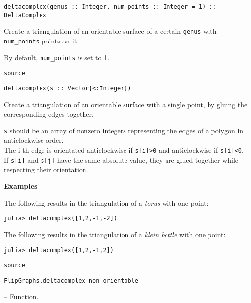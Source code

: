 \begin{adjustwidth}{2em}{0pt}


\begin{verbatim}
deltacomplex(genus :: Integer, num_points :: Integer = 1) :: DeltaComplex
\end{verbatim}

Create a triangulation of an orientable surface of a certain \texttt{genus} with \texttt{num\_points} points on it. 

By default, \texttt{num\_points} is set to 1.



\href{https://github.com/schto223/FlipGraphs.jl/blob/e35d43698a06b86273148826b79d585ba04fcd26/src/deltaComplex.jl#L590-L596}{\texttt{source}}



\begin{verbatim}
deltacomplex(s :: Vector{<:Integer})
\end{verbatim}

Create a triangulation of an orientable surface with a single point, by gluing the corresponding edges together.

\texttt{s} should be an array of nonzero integers representing the edges of a polygon in anticlockwise order.\\
The i-th edge is orientated anticlockwise if \texttt{s[i]>0} and anticlockwise if \texttt{s[i]<0}.\\
If \texttt{s[i]} and \texttt{s[j]} have the same absolute value, they are glued together while respecting their orientation.

\textbf{Examples}

The following results in the triangulation of a \emph{torus} with one point:


\begin{verbatim}
julia> deltacomplex([1,2,-1,-2])
\end{verbatim}

The following results in the triangulation of a \emph{klein bottle} with one point:


\begin{verbatim}
julia> deltacomplex([1,2,-1,2])
\end{verbatim}



\href{https://github.com/schto223/FlipGraphs.jl/blob/e35d43698a06b86273148826b79d585ba04fcd26/src/deltaComplex.jl#L646-L665}{\texttt{source}}


\end{adjustwidth}
\hypertarget{14191397339116909052}{\texttt{FlipGraphs.deltacomplex\_non\_orientable}}  -- {Function.}

